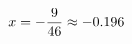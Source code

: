 \documentclass[preview]{standalone}
\begin{document}
\begin{align*}
\special{dvisvgm:raw <g id='unique000'>}x = - \frac{9}{46} \approx -0.196\special{dvisvgm:raw </g>}
\end{align*}
\end{document}
